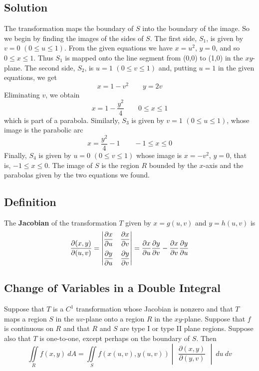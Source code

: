 \subsection*{Solution}
The transformation maps the boundary of $S$ into the boundary of the image.
So we begin by finding the images of the sides of $S$. The first side, $S_1$,
is given by $v=0$ $(0\leq u\leq 1)$. From the given equations we have $x=u^2$, $y=0$,
and so $0\leq x\leq 1$. Thus $S_1$ is mapped onto the line segment from (0,0) to (1,0)
in the $xy$-plane. The second side, $S_2$, is $u=1$ $(0\leq v\leq 1)$ and, putting
$u=1$ in the given equations, we get
$$x=1-v^2 \qquad y=2v$$
Eliminating $v$, we obtain
$$x=1-\frac{y^2}{4} \qquad 0\leq x\leq 1$$
which is part of a parabola. Similarly, $S_3$ is given by $v=1$ $(0\leq u\leq 1)$, whose
image is the parabolic arc
$$x=\frac{y^2}{4}-1 \qquad -1\leq x\leq 0$$
Finally, $S_4$ is given by $u=0$ $(0\leq v\leq 1)$ whose image is $x=-v^2$, $y=0$,
that is, $-1\leq x\leq 0$. The image of $S$ is the region $R$ bounded by the $x$-axis
and the parabolas given by the two equations we found.

\subsection*{Definition}
The \textbf{Jacobian} of the transformation $T$ given by $x=g(u,v)$ and $y=h(u,v)$ is
$$\pdv{(x,y)}{(u,v)}=
    \begin{vmatrix}
        \dfrac{\partial x}{\partial u} & \dfrac{\partial x}{\partial v} \\[1em]
        \dfrac{\partial y}{\partial u} & \dfrac{\partial y}{\partial v}
    \end{vmatrix}
    =\pdv{x}{u}\pdv{y}{v}-\pdv{x}{v}\pdv{y}{u}$$

\subsection*{Change of Variables in a Double Integral}
Suppose that $T$ is a $C^1$ transformation whose Jacobian is nonzero and that $T$
maps a region $S$ in the $uv$-plane onto a region $R$ in the $xy$-plane. Suppose
that $f$ is continuous on $R$ and that $R$ and $S$ are type I or type II plane regions.
Suppose also that $T$ is one-to-one, except perhaps on the boundary of $S$. Then
$$\iint\limits_R f(x,y)\:dA=\iint\limits_S f(x(u,v),y(u,v))\begin{vmatrix}
        \dfrac{\partial (x,y)}{\partial (y,v)}
    \end{vmatrix}\:du\:dv$$

